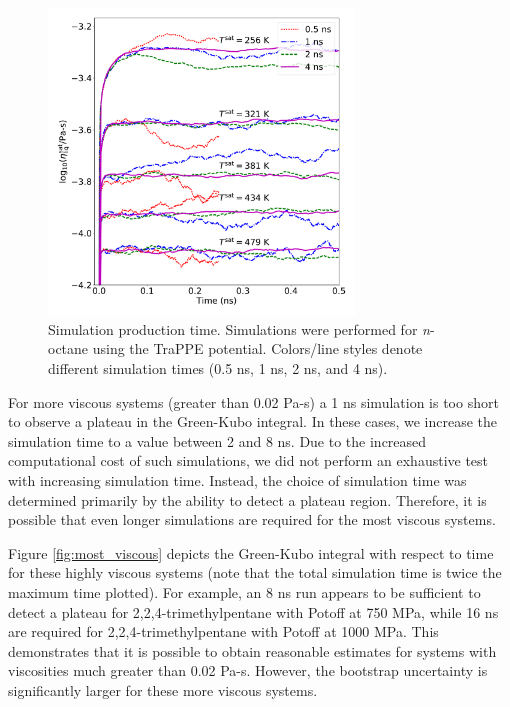 \documentclass[preprint,review,11pt]{elsarticle}
\begin{document}
	\begin{figure}[htb!]
		\centering
		\includegraphics[width=3.2in]{simulation_time}
		\caption{Simulation production time. Simulations were performed for \textit{n}-octane using the TraPPE potential. Colors/line styles denote different simulation times (0.5 ns, 1 ns, 2 ns, and 4 ns).}
		\label{fig:simulation_time}
	\end{figure} 

    For more viscous systems (greater than 0.02 Pa-s) a 1 ns simulation is too short to observe a plateau in the Green-Kubo integral. In these cases, we increase the simulation time to a value between 2 and 8 ns. Due to the increased computational cost of such simulations, we did not perform an exhaustive test with increasing simulation time. Instead, the choice of simulation time was determined primarily by the ability to detect a plateau region. Therefore, it is possible that even longer simulations are required for the most viscous systems. 
    
    Figure \ref{fig:most_viscous} depicts the Green-Kubo integral with respect to time for these highly viscous systems (note that the total simulation time is twice the maximum time plotted). For example, an 8 ns run appears to be sufficient to detect a plateau for 2,2,4-trimethylpentane with Potoff at 750 MPa, while 16 ns are required for 2,2,4-trimethylpentane with Potoff at 1000 MPa. This demonstrates that it is possible to obtain reasonable estimates for systems with viscosities much greater than 0.02 Pa-s. However, the bootstrap uncertainty is significantly larger for these more viscous systems.
    
    
    
\end{document}
